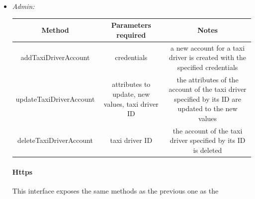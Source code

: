 \documentclass{article}
\begin{document}
\begin{itemize}
\begin{table}[H]
\begin{adjustbox}{width=1.2\textwidth}
		\end{adjustbox}
	\end{table}		
	\item \textit{Admin:}
		\begin{adjustbox}{width=1.2\textwidth}	
			\begin{tabular}{*{3}{c}}
				\toprule
				Method & Parameters required & Notes \\
				\midrule
				addTaxiDriverAccount & credentials & a new account for a taxi driver is created with the specified credentials\\ 
				updateTaxiDriverAccount & attributes to update, new values, taxi driver ID & the attributes of the account of the taxi driver specified by its ID are updated to the new values\\ 
				deleteTaxiDriverAccount & taxi driver ID & the account of the taxi driver specified by its ID is deleted\\
				\bottomrule
			\end{tabular}
		\end{adjustbox}	
		
\paragraph{Https} %
This interface exposes the same methods as the previous one as the 
		

\end{itemize}
\end{document}
